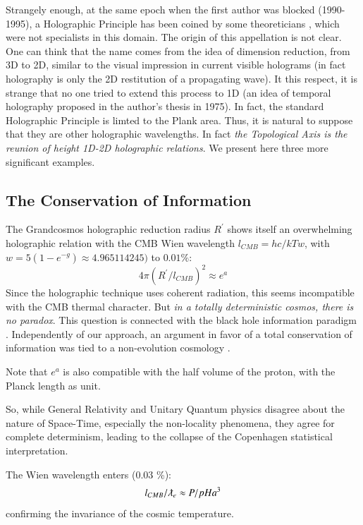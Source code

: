 \documentclass[twoside,draft]{article}
\begin{document}
\begin{sloppypar}
Strangely enough, at the same epoch when the first author was blocked (1990-1995), a Holographic Principle has been coined by some theoreticians \cite{Bousso}, which were not specialists in this domain. The origin of this appellation is not clear. One can think that the name comes from the idea of dimension reduction, from 3D to 2D, similar to the visual impression in current visible holograms (in fact holography is only the 2D restitution of a propagating wave). It this respect, it is strange that no one tried to extend this process to 1D (an idea of temporal holography proposed in the author's thesis in 1975). In fact, the standard Holographic Principle is limted to the Plank area. Thus, it is natural to suppose that they are other holographic wavelengths. In fact \textit{the Topological Axis is the reunion of height 1D-2D holographic relations}. We present here three more significant examples. 

\subsection{The Conservation of Information}

The Grandcosmos holographic reduction radius $R^{\prime}$ shows itself an overwhelming holographic
relation with the CMB Wien wavelength $l_{CMB} = hc/kTw $, with $w = 5 (1-e^{-g}) \approx 4.965114245)$ to $0.01\%$:
\begin{equation}
4\pi(R^{\prime}/l_{CMB})^{2} \approx e^{a}
\end{equation}
Since the holographic technique uses coherent radiation, this seems incompatible with the CMB
thermal character. But \textit{in a totally deterministic cosmos, there is no paradox}. This question is
connected with the black hole information paradigm \cite{Preskill}. Independently of our approach, an
argument in favor of a total conservation of information was tied to a non-evolution cosmology
\cite{Nikolic}. 

Note that $e^{a}$ is also compatible with the half volume of the proton, with
the Planck length as unit.

So, while General Relativity and Unitary Quantum physics disagree about the nature of Space-Time, especially the non-locality phenomena, they agree for complete determinism, leading to the collapse of the
Copenhagen statistical interpretation. 

The Wien wavelength enters (0.03 \%):
\begin{equation}
l_{CMB} / \lambdabar_e \approx P/pH a^3
\end{equation}
confirming the invariance of the cosmic temperature. 


\end{sloppypar}
\end{document}
